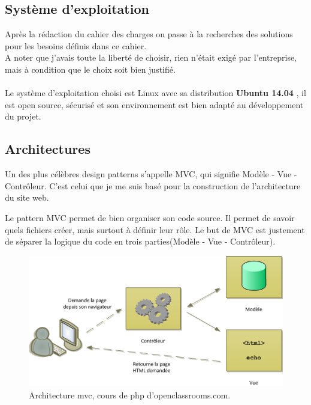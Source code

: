 \documentclass[12pt]{article}
\begin{document}
\subsection{Système d'exploitation}
Après la rédaction du cahier des charges  on passe à la recherches des solutions pour les besoins définis dans ce cahier. \\
A noter que j'avais toute la liberté de choisir, rien n'était exigé par l'entreprise, mais à condition que 
le choix soit bien justifié.\\ \\

Le système d'exploitation choisi est Linux avec sa distribution \textbf{Ubuntu 14.04} , il est open source, sécurisé et son environnement est bien adapté au développement du projet. 

\subsection{Architectures}
Un des plus célèbres design patterns s'appelle MVC, qui signifie Modèle - Vue - Contrôleur. C'est celui que je me suis basé pour la construction de l’architecture du site web.

Le pattern MVC permet de bien organiser son code source. Il permet de savoir quels fichiers créer, mais surtout à définir leur rôle. Le but de MVC est justement de séparer la logique du code en trois parties(Modèle - Vue - Contrôleur).\\

\begin{center}
\begin{figure}[htp]
  \centering
  \includegraphics[width=12cm]{mvc.png}
  \caption{Architecture mvc, cours de php d'openclassrooms.com.}
  \label{fig:une-autre-image}
\end{figure}

\end{center}
\end{document}
